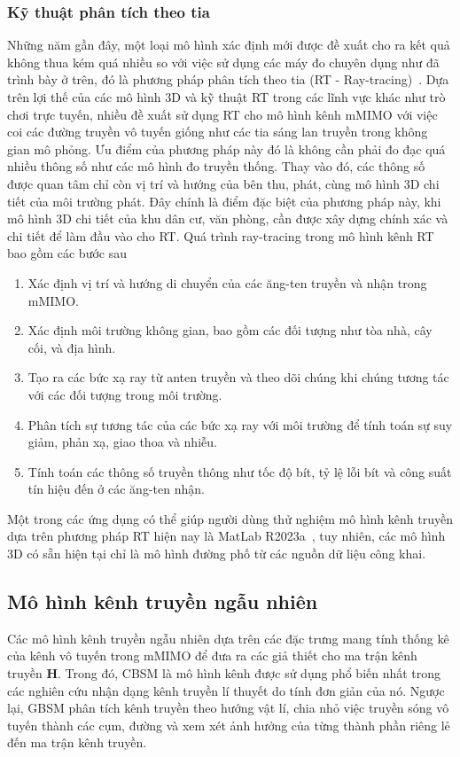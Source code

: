 \subsubsection{Kỹ thuật phân tích theo tia}
Những năm gần đây, một loại mô hình xác định mới được đề xuất cho ra kết quả không thua kém quá nhiều so với việc sử dụng các máy đo chuyên dụng như đã trình bày ở trên, đó là phương pháp phân tích theo tia (RT - Ray-tracing)~\cite{Liu2020}. Dựa trên lợi thế của các mô hình 3D và kỹ thuật RT trong các lĩnh vực khác như trò chơi trực tuyến, nhiều đề xuất sử dụng RT cho mô hình kênh mMIMO với việc coi các đường truyền  vô tuyến giống như các tia sáng lan truyền trong không gian mô phỏng. Ưu điểm của phương pháp này đó là không cần phải đo đạc quá nhiều thông số như các mô hình đo truyền thống. Thay vào đó, các thông số được quan tâm chỉ còn vị trí và hướng của bên thu, phát, cùng mô hình 3D chi tiết của môi trường phát. Đây chính là điểm đặc biệt của phương pháp này, khi mô hình 3D chi tiết của khu dân cư, văn phòng, cần được xây dựng chính xác và chi tiết để làm đầu vào cho RT. Quá trình ray-tracing trong mô hình kênh RT bao gồm các bước sau
\begin{enumerate}
    \item Xác định vị trí và hướng di chuyển của các ăng-ten truyền và nhận trong mMIMO.
    \item Xác định môi trường không gian, bao gồm các đối tượng như tòa nhà, cây cối, và địa hình.
    \item Tạo ra các bức xạ ray từ anten truyền và theo dõi chúng khi chúng tương tác với các đối tượng trong môi trường.
    \item Phân tích sự tương tác của các bức xạ ray với môi trường để tính toán sự suy giảm, phản xạ, giao thoa và nhiễu.
    \item Tính toán các thông số truyền thông như tốc độ bít, tỷ lệ lỗi bít và công suất tín hiệu đến ở các ăng-ten nhận.
\end{enumerate}
Một trong các ứng dụng có thể giúp người dùng thử nghiệm mô hình kênh truyền dựa trên phương pháp RT hiện nay là MatLab R2023a~\cite{RT}, tuy nhiên, các mô hình 3D có sẵn hiện tại chỉ là mô hình đường phố từ các nguồn dữ liệu công khai.

\subsection{Mô hình kênh truyền ngẫu nhiên}

Các mô hình kênh truyền ngẫu nhiên dựa trên các đặc trưng mang tính thống kê của kênh vô tuyến trong mMIMO để đưa ra các giả thiết cho ma trận kênh truyền $\mathbf{H}$. Trong đó, CBSM là mô hình kênh được sử dụng phổ biến nhất trong các nghiên cứu nhận dạng kênh truyền lí thuyết do tính đơn giản của nó. Ngược lại, GBSM phân tích kênh truyền theo hướng vật lí, chia nhỏ việc truyền sóng vô tuyến thành các cụm, đường và xem xét ảnh hưởng của từng thành phần riêng lẻ đến ma trận kênh truyền.

